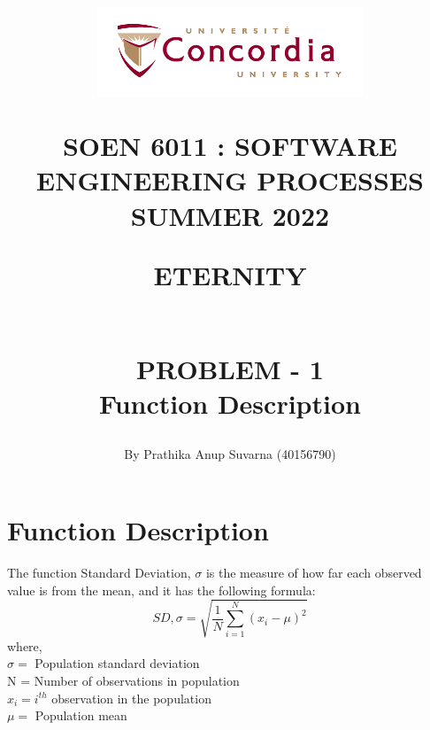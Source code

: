 \documentclass[12pt,letterpaper]{report}
\begin{document}
\title{\begin{figure}[htb]
\begin{center}
\includegraphics[width=8cm]{univ_logo}
\end{center}
\end{figure}SOEN 6011 : SOFTWARE ENGINEERING PROCESSES\\[.5em]
SUMMER 2022\\\vspace*{0.9in}
\begin{Large}
\textbf{ETERNITY} 
\end{Large}
\vspace*{0.9in}
\begin{Large}
\textbf{\\PROBLEM - 1} 
\\Function Description 
\end{Large}}
\author{By Prathika Anup Suvarna (40156790)}
\maketitle 
{}
\setcounter{page}{0}

\tableofcontents

\listoffigures{}


\chapter{Function Description}

\normalsize{The function Standard Deviation, $\sigma$ is the measure of how far each observed value is from the mean, and it has the following formula: \cite{definition} 
$$SD, \sigma = \sqrt{\frac{1}{N}\sum_{i=1}^{N}(x_i-\mu)^2}$$
where,\\$\sigma =$ Population standard deviation\\
N = Number of observations in population\\
$x_i = i^{th}$ observation in the population\\
$\mu =$ Population mean}
\end{document}
